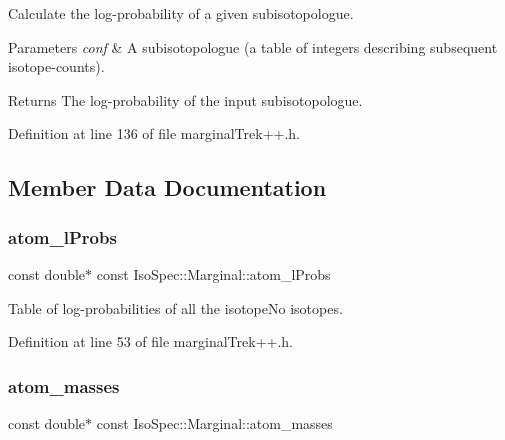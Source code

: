 Calculate the log-\/probability of a given subisotopologue. 


\begin{DoxyParams}{Parameters}
{\em conf} & A subisotopologue (a table of integers describing subsequent isotope-\/counts). \\
\hline
\end{DoxyParams}
\begin{DoxyReturn}{Returns}
The log-\/probability of the input subisotopologue. 
\end{DoxyReturn}


Definition at line 136 of file marginal\+Trek++.\+h.



\subsection{Member Data Documentation}
\mbox{\label{class_iso_spec_1_1_marginal_af059df011e707781fdd4c1d7b70bd91a}} 
\subsubsection{\texorpdfstring{atom\+\_\+l\+Probs}{atom\_lProbs}}
{\footnotesize\ttfamily const double$\ast$ const Iso\+Spec\+::\+Marginal\+::atom\+\_\+l\+Probs\hspace{0.3cm}{\ttfamily [protected]}}

Table of log-\/probabilities of all the isotope\+No isotopes. 

Definition at line 53 of file marginal\+Trek++.\+h.

\mbox{\label{class_iso_spec_1_1_marginal_a91265e07f5bb65314995f816f5a9c729}} 
\subsubsection{\texorpdfstring{atom\+\_\+masses}{atom\_masses}}
{\footnotesize\ttfamily const double$\ast$ const Iso\+Spec\+::\+Marginal\+::atom\+\_\+masses\hspace{0.3cm}{\ttfamily [protected]}}

